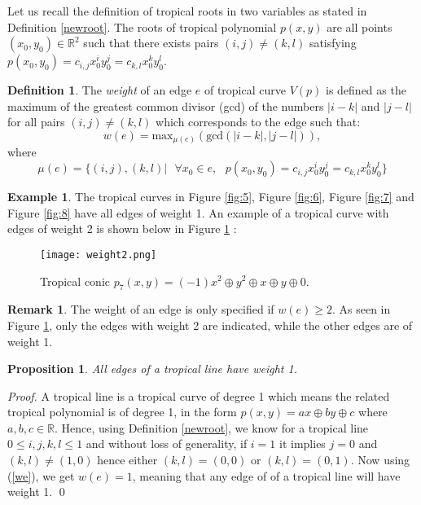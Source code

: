 \documentclass[]{article}
\theoremstyle{definition}
\numberwithin{equation}{section}
\newtheorem{prop}[thm]{Proposition}
\newtheorem{defn}[thm]{Definition}
\newtheorem{examp}[thm]{Example}
\newtheorem{rmk}[thm]{Remark}
\renewcommand{\.}{\,.}
\begin{document}
\hspace{3mm} Let us recall the definition of tropical roots in two variables as stated in Definition \ref{newroot}. The roots of tropical polynomial $p(x,y)$ are all points $(x_0,y_0) \in \mathbb{R}^2$ such that there exists pairs $(i,j)\neq(k,l)$ satisfying $p(x_0,y_0)=c_{i,j}x_0^iy_0^j=c_{k,l}x_0^k y_0^l$. 
\begin{defn} The \emph{weight} of an edge $e$ of tropical curve $V(p)$ is defined as the maximum of the greatest common divisor (gcd) of the numbers $|i-k|$ and $|j-l|$ for all pairs $(i,j)\neq(k,l)$ which corresponds to the edge such that:
	\begin{equation} \label{we}
		w(e)=\textrm{max}_{\mu(e)}(\textrm{gcd}(|i-k|,|j-l|)),
	\end{equation} 
where
\begin{equation}
	\mu(e)=\{(i,j),(k,l)|\textrm{ }\forall x_0 \in e,\textrm{ } p(x_0,y_0)=c_{i,j}x_0^iy_0^j=c_{k,l}x_0^k y_0^l\}
\end{equation}
\end{defn}

\begin{examp}\label{Newd}
	The tropical curves in Figure \ref{fig:5}, Figure \ref{fig:6}, Figure \ref{fig:7} and Figure \ref{fig:8} have all edges of weight 1. An example of a tropical curve with edges of weight 2 is shown below in Figure \ref{fig:9} :
	\begin{figure}[H]
		\centering
		\texttt{[image: weight2.png]}
		\caption{Tropical conic $p_7(x,y)=(-1)x^2 \oplus y^2 \oplus x \oplus y\oplus 0$.}
		\label{fig:9} 
	\end{figure}
\end{examp}
\begin{rmk}
	The weight of an edge is only specified if $w(e)\geq2$. As seen in Figure \ref{fig:9}, only the edges with weight 2 are indicated, while the other edges are of weight 1.
\end{rmk}
\begin{prop}
	\emph{All edges of a tropical line have weight 1.} \end{prop}\vspace{-5mm}
	\hspace{3mm} \emph{Proof.} A tropical line is a tropical curve of degree 1 which means the related tropical polynomial is of degree 1, in the form $p(x,y)=ax \oplus by \oplus c$ where $a,b,c\in\mathbb{R}$. Hence, using Definition \ref{newroot}, we know for a tropical line $0\leq i,j,k,l\leq1$ and without loss of generality, if $i=1$ it implies $j=0$ and $(k,l)\neq(1,0)$ hence either $(k,l)=(0,0)$ or $(k,l)=(0,1)$. Now using (\ref{we}), we get $w(e)=1$, meaning that any edge of of a tropical line will have weight 1. \qed 
\end{document}
